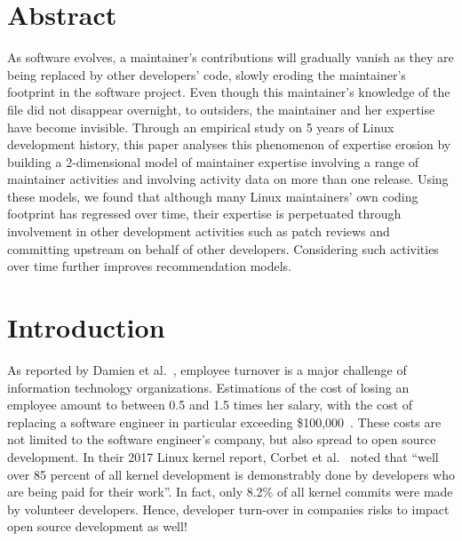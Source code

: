 \label{sec:Theme3}

\section{Abstract}

As software evolves, a maintainer's contributions will gradually vanish as they are being replaced by other developers' code, slowly eroding the maintainer's footprint in the software project. Even though this maintainer's knowledge of the file did not disappear overnight, to outsiders, the maintainer and her expertise have become invisible. Through an empirical study on 5 years of Linux development history, this paper analyses this phenomenon of expertise erosion by building a 2-dimensional model of maintainer expertise involving a range of maintainer activities and involving activity data on more than one release. Using these models, we found that although many Linux maintainers' own coding footprint has regressed over time, their expertise is perpetuated through involvement in other development activities such as patch reviews and committing upstream on behalf of other developers. Considering such activities over time further improves recommendation models.


\section{Introduction}

As reported by Damien et al.~\cite{turnover}, employee turnover is a major challenge of information technology organizations. Estimations of the cost of losing an employee amount to between 0.5 and 1.5 times her salary, with the cost of replacing a software engineer in particular exceeding \$100,000~\cite{economist5988}. These costs are not limited to the software engineer's company, but also spread to open source development. In their 2017 Linux kernel report, Corbet et al.~\cite{corbet17} noted that ``well over 85 percent of all kernel development is demonstrably done by developers who are being paid for their work''. In fact, only 8.2\% of all kernel commits were made by volunteer developers. Hence, developer turn-over in companies risks to impact open source development as well!



